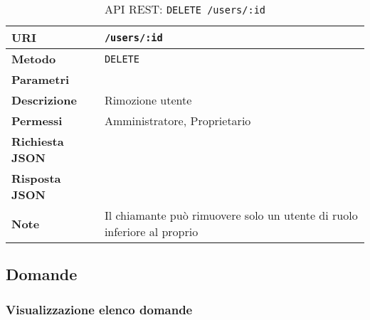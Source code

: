         \begin{table}[H]
            \begin{center}
                \begin{tabular}{p{} p{}}
                    \toprule
                    \textbf{URI} & \texttt{/users/:id} \\ \midrule
                    \textbf{Metodo} & \texttt{DELETE} \\ \midrule
                    \textbf{Parametri} & \\ \midrule
                    \textbf{Descrizione} & Rimozione utente \\ \midrule
                    \textbf{Permessi} & Amministratore, Proprietario  \\ \midrule
                    \textbf{Richiesta JSON} & \\ \midrule
                    \textbf{Risposta JSON} & \\ \midrule
                    \textbf{Note} & Il chiamante può rimuovere solo un utente di ruolo
                        inferiore al proprio \\
                    \bottomrule
                \end{tabular}
                \caption{API REST: \texttt{DELETE /users/:id}}
            \end{center}
        \end{table}

\subsection{Domande}

    \subsubsection{Visualizzazione elenco domande}

